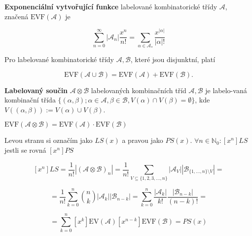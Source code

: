\begin{definice}
	\textbf{Exponenciální vytvořující funkce} labelované kombinatorické třídy $\mathcal{A}$, značená $\text{EVF}(\mathcal{A})$ je
	
	$$
	\sum_{n=0}^{\infty}|\mathcal{A}_{n}|\frac{x^{n}}{n!} = \sum_{\alpha \in \mathcal{A}_{\ast}} \frac{x^{|\alpha|}}{|\alpha|!}
	$$
\end{definice}

\begin{pozor}
	Pro labelované kombinatorické třídy $\mathcal{A}, \mathcal{B}$, které jsou disjunktní, platí
	
	$$
	\text{EVF}(\mathcal{A} \cup \mathcal{B}) = \text{EVF}(\mathcal{A}) + \text{EVF}(\mathcal{B}).
	$$
\end{pozor}

\begin{definice}
	\textbf{Labelovaný součin} $\mathcal{A} \otimes \mathcal{B}$ labelovaných kombinačních tříd $\mathcal{A}, \mathcal{B}$ je labelo-\newline vaná kombinační třída $\{(\alpha, \beta); \alpha \in \mathcal{A}, \beta \in \mathcal{B}, V(\alpha) \cap V(\beta) = \emptyset\}$, kde $V((\alpha, \beta)) := V(\alpha) \cup V(\beta)$.
\end{definice}

\begin{tvrz}
	$\text{EVF}(\mathcal{A} \otimes \mathcal{B}) = \text{EVF}(\mathcal{A}) \cdot \text{EVF}(\mathcal{B})$
\end{tvrz}

\begin{dukaz}
	Levou stranu si označím jako $LS(x)$ a pravou jako $PS(x)$. $\forall n \in \mathbb{N}_{0}: [x^{n}] LS$ jestli se rovná $[x^{n}] PS$
	
	$$
	[x^{n}]LS = \frac{1}{n!} |(\mathcal{A} \otimes \mathcal{B})_{n}| = \frac{1}{n!} \sum_{V \subseteq \{1,2,3, \dots ,n\}} |\mathcal{A}_{V}| |\mathcal{B}_{\{1,\dots,n\} \setminus V}| =
	$$
	
	$$
	= \frac{1}{n!} \sum_{k=0}^{n} \binom{n}{k} |\mathcal{A}_{k}| |\mathcal{B}_{n-k}| = \sum_{k = 0}^{n} \frac{|\mathcal{A}_{k}|}{k!} \frac{|\mathcal{B}_{n-k}|}{(n-k)!} =
	$$
	
	$$
	= \sum_{k=0}^{n} [x^{k}]\text{EV}(\mathcal{A})[x^{n-k}]\text{EVF}(\mathcal{B}) = PS(x)
	$$
\end{dukaz}